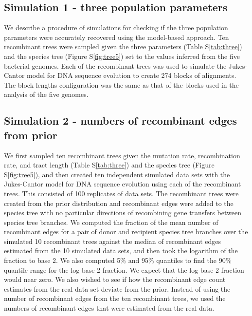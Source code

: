 \documentclass[10pt]{article}
\begin{document}
\subsection*{Simulation 1 - three population parameters}

We describe a procedure of simulations for checking if the three
population parameters were accurately recovered using the model-based approach.
Ten recombinant trees were sampled given the three parameters (Table
S\ref{tab:three}) and the species tree (Figure S\ref{fig:tree5}) set to the
values inferred from the five bacterial genomes.  Each of the recombinant trees
was used to simulate the Jukes-Cantor model for DNA sequence evolution to create
274 blocks of alignments.  The block lengths configuration was the same as that
of the blocks used in the analysis of the five genomes.  


\subsection*{Simulation 2 - numbers of recombinant edges from prior}

We first sampled ten recombinant trees given the mutation rate, recombination
rate, and tract length (Table S\ref{tab:three}) and the species tree (Figure
S\ref{fig:tree5}), and then created ten independent simulated data sets with
the Jukes-Cantor model for DNA sequence evolution using each of the recombinant
trees. This consisted of 100 replicates of data sets.  The recombinant trees
were created from the prior distribution and recombinant edges were added to the
species tree with no particular directions of recombining gene transfers between
species tree branches.  We computed the fraction of the mean number of recombinant
edges for a pair of donor and recipient species tree branches over the simulated
10 recombinant trees against the median of recombinant edges estimated from the
10 simulated data sets, and then took the logarithm of the fraction to base 2. We
also computed 5\% and 95\% quantiles to find the 90\% quantile range for the log
base 2 fraction.  We expect that the log base 2 fraction would near zero. We also
wished to see if how the recombinant edge count estimates from the real data set
deviate from the prior. Instead of using the number of recombinant edges from
the ten recombinant trees, we used the numbers of recombinant edges that were
estimated from the real data. 
\end{document}
